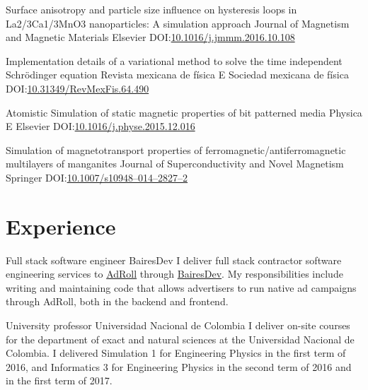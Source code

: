 \documentclass[12pt,english]{moderncv}
\begin{document}
        {%
            Surface anisotropy and particle size influence on hysteresis loops
            in La2/3Ca1/3MnO3 nanoparticles: A simulation approach%
        }
        {Journal of Magnetism and Magnetic Materials}
        {Elsevier}
        {}
        {DOI:\@ \href{https://doi.org/10.1016/j.jmmm.2016.10.108}{10.1016/j.jmmm.2016.10.108}}

        {%
            Implementation details of a variational method to solve the time
            independent Schrödinger equation%
        }
        {Revista mexicana de física E}
        {Sociedad mexicana de física}
        {}
        {DOI:\@ \href{https://doi.org/10.31349/RevMexFis.64.490}{10.31349/RevMexFis.64.490}}

        {Atomistic Simulation of static magnetic properties of bit patterned media}
        {Physica E}
        {Elsevier}
        {}
        {DOI:\@ \href{https://doi.org/10.1016/j.physe.2015.12.016}{10.1016/j.physe.2015.12.016}}

        {%
            Simulation of magnetotransport properties of
            ferromagnetic/antiferromagnetic multilayers of manganites%
        }
        {Journal of Superconductivity and Novel Magnetism}
        {Springer}
        {}
        {DOI:\@ \href{https://doi.org/10.1007/s10948-014-2827-2}{10.1007/s10948--014--2827--2}}


\section{Experience}

        {Full stack software engineer}
        {BairesDev}
        {}
        {}
        {%
            I deliver full stack contractor software engineering services to
            \href{https://www.adroll.com/}{AdRoll} through
            \href{http://www.bairesdev.com/}{BairesDev}. My responsibilities
            include writing and maintaining code that allows advertisers to run
            native ad campaigns through AdRoll, both in the backend and
            frontend.
        }

        {University professor}
        {Universidad Nacional de Colombia}
        {}
        {}
        {%
            I deliver on-site courses for the department of exact and natural
            sciences at the Universidad Nacional de Colombia. I delivered
            Simulation 1 for Engineering Physics in the first term of 2016, and
            Informatics 3 for Engineering Physics in the second term of 2016
            and in the first term of 2017.
        }
\end{document}
